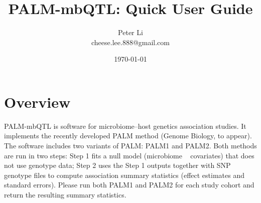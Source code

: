 \documentclass[11pt]{article}
\title{PALM-mbQTL: Quick User Guide}
\author{Peter Li \\ cheese.lee.888@gmail.com}
\date{\today}
\begin{document}
\maketitle

\section{Overview}
PALM-mbQTL is software for microbiome–host genetics association studies. 
It implements the recently developed PALM method (Genome Biology, to appear). 
The software includes two variants of PALM: PALM1 and PALM2. 
Both methods are run in two steps: 
Step 1 fits a null model (microbiome ~ covariates) that does not use genotype data; 
Step 2 uses the Step 1 outputs together with SNP genotype files to compute association 
summary statistics (effect estimates and standard errors). 
Please run both PALM1 and PALM2 for each study cohort and return the resulting 
summary statistics.









\end{document}
